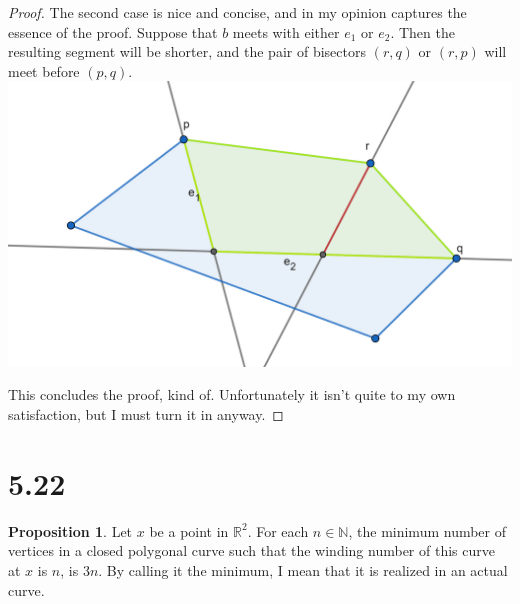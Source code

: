 \documentclass[12pt]{article}
\newcommand{\R}{\mathbb{R}}
\newcommand{\N}{\mathbb{N}}
\theoremstyle{definition}
\newtheorem{proposition}{Proposition}
\begin{document}
\begin{proof}
The second case is nice and concise, and in my opinion captures the essence of the proof. Suppose that $b$ meets with either $e_1$ or $e_2$. Then the resulting segment will be shorter, and the pair of bisectors $(r,q)$ or $(r,p)$ will meet before $(p,q)$. \\

\includegraphics[scale=0.5]{proof.png} 

This concludes the proof, kind of. Unfortunately it isn't quite to my own satisfaction, but I must turn it in anyway.
\end{proof}


\section{5.22}


\begin{proposition}

Let $x$ be a point in $\R^2$. For each $n\in \N$, the minimum number of vertices in a closed polygonal curve such that the winding number of this curve at $x$ is $n$, is $3n$. By calling it the minimum, I mean that it is realized in an actual curve.

\end{proposition}
\end{document}
